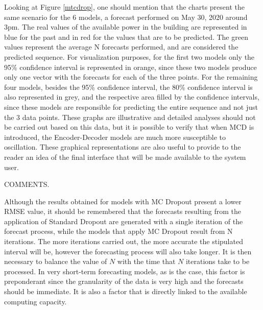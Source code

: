 Looking at Figure \ref{mtcdrop}, one should mention that the charts present the same scenario for the 6 models, a forecast performed on May 30, 2020 around 3pm. The real values of the available power in the building are represented in blue for the past and in red for the values that are to be predicted. The green values represent the average N forecasts performed, and are considered the predicted sequence. For visualization purposes, for the first two models only the 95\% confidence interval is represented in orange, since these two models produce only one vector with the forecasts for each of the three points. For the remaining four models, besides the 95\% confidence interval, the 80\% confidence interval is also represented in grey, and the respective area filled by the confidence intervals, since these models are responsible for predicting the entire sequence and not just the 3 data points. These graphs are illustrative and detailed analyses should not be carried out based on this data, but it is possible to verify that when \ac{MCD} is introduced, the Encoder-Decoder models are much more susceptible to oscillation. These graphical representations are also useful to provide to the reader an idea of the final interface that will be made available to the system user. 


















COMMENTS.

Although the results obtained for models with MC Dropout present a lower \ac{RMSE} value, it should be remembered that the forecasts resulting from the application of Standard Dropout are generated with a single iteration of the forecast process, while the models that apply MC Dropout result from N iterations. The more iterations carried out, the more accurate the stipulated interval will be, however the forecasting process will also take longer. It is then necessary to balance the value of $N$ with the time that $N$ iterations take to be processed. In very short-term forecasting models, as is the case, this factor is preponderant since the granularity of the data is very high and the forecasts should be immediate. It is also a factor that is directly linked to the available computing capacity.


